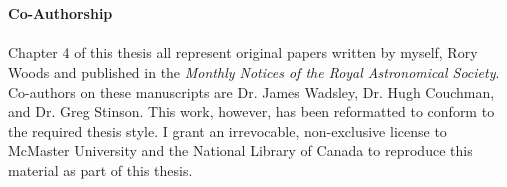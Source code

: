 \thispagestyle{fancy}

\textrm{}\\\\
\noindent\textbf{\huge\textsf{Co-Authorship}}\\\\

\noindent 
Chapter 4 of this thesis all represent original papers written by
myself, Rory Woods and published in the \textit{Monthly
Notices of the Royal Astronomical Society}.  Co-authors on these
manuscripts are Dr. James Wadsley, Dr. Hugh Couchman, and Dr. Greg Stinson.  This
work, however, has been reformatted to conform to the required thesis
style.  I grant an irrevocable, non-exclusive license to McMaster
University and the National Library of Canada to reproduce this
material as part of this thesis.
\newpage
\thispagestyle{empty}
\mbox{}
